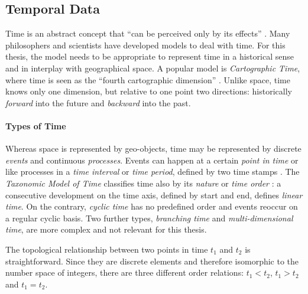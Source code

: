 

\subsection{Temporal Data} %
\label{sub:temporal_data}

Time is an abstract concept that ``can be perceived only by its effects''
\cite[p. 27]{Langran1989timeingis}.
Many philosophers and scientists have developed models to deal with time. For this thesis, the model needs to be appropriate to represent time in a historical sense and in interplay with geographical space. A popular model is \emph{Cartographic Time}, where time is seen as the ``fourth cartographic dimension''
\cite[p. 28]{Langran1989timeingis}.
Unlike space, time knows only one dimension, but relative to one point two directions: historically \emph{forward} into the future and \emph{backward} into the past.

\paragraph{Types of Time} %
\label{par:types_of_time}

Whereas space is represented by geo-objects, time may be represented by discrete \emph{events} and continuous \emph{processes}. Events can happen at a certain \emph{point in time} or like processes in a \emph{time interval} or \emph{time period}, defined by two time stamps
\cite[chapter 2, pp. 47-49]{solana2014spatio}.
The \emph{Taxonomic Model of Time} classifies time also by its \emph{nature} or \emph{time order}
\cite{frank98typesoftime}:
a consecutive development on the time axis, defined by start and end, defines \emph{linear time}. On the contrary, \emph{cyclic time} has no predefined order and events reoccur on a regular cyclic basis. Two further types, \emph{branching time} and \emph{multi-dimensional time}, are more complex and not relevant for this thesis.

The topological relationship between two points in time $t_1$ and $t_2$ is straightforward. Since they are discrete elements and therefore isomorphic to the number space of integers, there are three different order relations: $t_1 < t_2$, $t_1 > t_2$ and $t_1 = t_2$.

